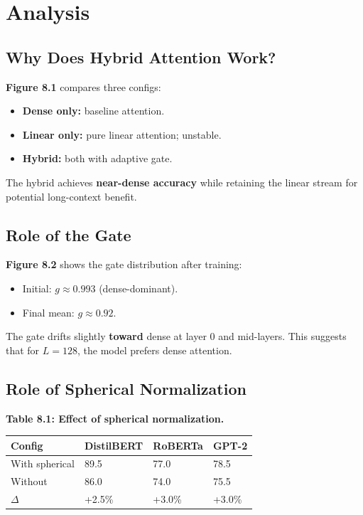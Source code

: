 \section{Analysis}

\subsection{Why Does Hybrid Attention Work?}

\textbf{Figure 8.1} compares three configs:

\begin{itemize}
\item \textbf{Dense only:} baseline attention.
\item \textbf{Linear only:} pure linear attention; unstable.
\item \textbf{Hybrid:} both with adaptive gate.

\end{itemize}
The hybrid achieves \textbf{near-dense accuracy} while retaining the linear 
stream for potential long-context benefit.

\subsection{Role of the Gate}

\textbf{Figure 8.2} shows the gate distribution after training:

\begin{itemize}
\item Initial: $g \approx 0.993$ (dense-dominant).
\item Final mean: $g \approx 0.92$.

\end{itemize}
The gate drifts slightly \textbf{toward} dense at layer 0 and mid-layers. This 
suggests that for $L = 128$, the model prefers dense attention.

\subsection{Role of Spherical Normalization}

\textbf{Table 8.1: Effect of spherical normalization.}

\begin{table}[H]
\centering
\small
\begin{tabular}{llll}
\toprule
\textbf{Config} & \textbf{DistilBERT} & \textbf{RoBERTa} & \textbf{GPT-2} \\
\midrule
With spherical & 89.5 & 77.0 & 78.5 \\
Without & 86.0 & 74.0 & 75.5 \\
$\Delta$ & +2.5\% & +3.0\% & +3.0\% \\
\bottomrule
\end{tabular}
\end{table}

